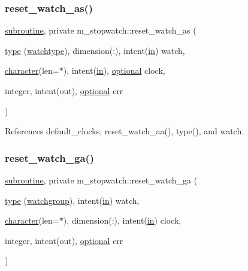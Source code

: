 \subsubsection{\texorpdfstring{reset\+\_\+watch\+\_\+as()}{reset\_watch\_as()}}
{\footnotesize\ttfamily \hyperlink{M__stopwatch_83_8txt_acfbcff50169d691ff02d4a123ed70482}{subroutine}, private m\+\_\+stopwatch\+::reset\+\_\+watch\+\_\+as (\begin{DoxyParamCaption}\item[{\hyperlink{stop__watch_83_8txt_a70f0ead91c32e25323c03265aa302c1c}{type} (\hyperlink{structm__stopwatch_1_1watchtype}{watchtype}), dimension(\+:), intent(\hyperlink{M__journal_83_8txt_afce72651d1eed785a2132bee863b2f38}{in})}]{watch,  }\item[{\hyperlink{option__stopwatch_83_8txt_abd4b21fbbd175834027b5224bfe97e66}{character}(len=$\ast$), intent(\hyperlink{M__journal_83_8txt_afce72651d1eed785a2132bee863b2f38}{in}), \hyperlink{option__stopwatch_83_8txt_aa4ece75e7acf58a4843f70fe18c3ade5}{optional}}]{clock,  }\item[{integer, intent(out), \hyperlink{option__stopwatch_83_8txt_aa4ece75e7acf58a4843f70fe18c3ade5}{optional}}]{err }\end{DoxyParamCaption})\hspace{0.3cm}{\ttfamily [private]}}



References default\+\_\+clocks, reset\+\_\+watch\+\_\+aa(), type(), and watch.

\mbox{\label{namespacem__stopwatch_aeeaefcdbbde78f813b93212704a46ce2}} 
\subsubsection{\texorpdfstring{reset\+\_\+watch\+\_\+ga()}{reset\_watch\_ga()}}
{\footnotesize\ttfamily \hyperlink{M__stopwatch_83_8txt_acfbcff50169d691ff02d4a123ed70482}{subroutine}, private m\+\_\+stopwatch\+::reset\+\_\+watch\+\_\+ga (\begin{DoxyParamCaption}\item[{\hyperlink{stop__watch_83_8txt_a70f0ead91c32e25323c03265aa302c1c}{type} (\hyperlink{structm__stopwatch_1_1watchgroup}{watchgroup}), intent(\hyperlink{M__journal_83_8txt_afce72651d1eed785a2132bee863b2f38}{in})}]{watch,  }\item[{\hyperlink{option__stopwatch_83_8txt_abd4b21fbbd175834027b5224bfe97e66}{character}(len=$\ast$), dimension(\+:), intent(\hyperlink{M__journal_83_8txt_afce72651d1eed785a2132bee863b2f38}{in})}]{clock,  }\item[{integer, intent(out), \hyperlink{option__stopwatch_83_8txt_aa4ece75e7acf58a4843f70fe18c3ade5}{optional}}]{err }\end{DoxyParamCaption})\hspace{0.3cm}{\ttfamily [private]}}



